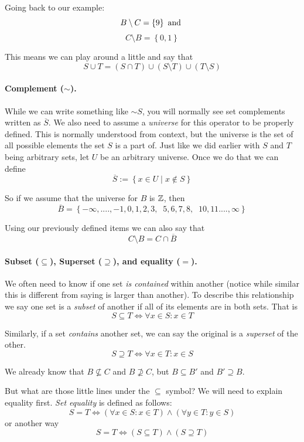 Going back to our example:
\[
B \setminus C = \left\{9\right\}\textnormal{ and }
\] \[
C \setminus B = \left\{0,1\right\}
\]

This means we can play around a little and say that 
\[
S \cup T = \left(S \cap T\right) \cup \left(S \setminus T\right) \cup  \left(T \setminus S\right) 
\]

\paragraph{Complement ($\sim$).}
While we can write something like $\sim S$, you will normally see set complements written as $\overline{S}$. 
We also need to assume a \emph{universe} for this operator to be properly defined. 
This is normally understood from context, but the universe is the set of all possible elements the set $S$ is a part of. 
Just like we did earlier with $S$ and $T$ being arbitrary sets, let $U$ be an arbitrary universe.
Once we do that we can define 
\[
\overline{S} := \left\{x \in U \mid x \notin S\right\}
\]

So if we assume that the universe for $B$ is $\operatorname{\mathbb{Z}}$,
then 
\[
\overline{B} = \left\{-\infty,....,-1,0,1,2,3,\;\;5,6,7,8,\;\;10,11....,\infty\right\} 
\]

Using our previously defined items we can also say that 
\[
C \setminus B = C \cap \overline{B}
\]

\paragraph{Subset ($\subseteq$), Superset ($\supseteq$), and equality ($=$).}
We often need to know if one set \textit{is contained} within another (notice while similar this is different from saying is larger than another). 
To describe this relationship we say one set is a \emph{subset} of another if all of its elements are in both sets. 
That is
\[
S \subseteq T \iff \forall x \in S : x \in T
\]

Similarly, if a set \textit{contains} another set, we can say the original is a \emph{superset} of the other. 
\[
S \supseteq T \iff \forall x \in T: x \in S
\] 

We already know that $B \nsubseteq C$ and $B \nsupseteq C$, but $B \subseteq B'$ and $B' \supseteq B$. 

But what are those little lines under the $\subseteq$ symbol? We will need to explain equality first. 
\emph{Set equality} is defined as follows:
\[
S = T \iff \left(\forall x \in S : x \in T\right) \wedge \left(\forall y \in T : y \in S\right)
\]
or another way
\[
S = T \iff \left(S \subseteq T\right) \wedge \left(S \supseteq T\right)
\]

